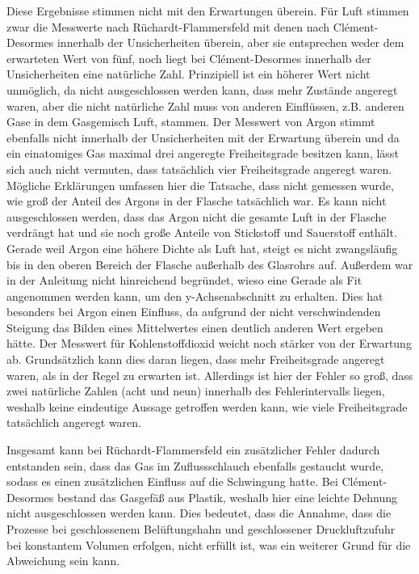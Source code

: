 \documentclass[
	a4paper,
	12pt,
	pagesize,
	ngerman
]{scrartcl}
\begin{document}
	Diese Ergebnisse stimmen nicht mit den Erwartungen überein.
	Für Luft stimmen zwar die Messwerte nach Rüchardt-Flammersfeld mit denen nach Clément-Desormes innerhalb der Unsicherheiten überein, aber sie entsprechen weder dem erwarteten Wert von fünf, noch liegt bei Clément-Desormes innerhalb der Unsicherheiten eine natürliche Zahl.
	Prinzipiell ist ein höherer Wert nicht unmöglich, da nicht ausgeschlossen werden kann, dass mehr Zustände angeregt waren, aber die nicht natürliche Zahl muss von anderen Einflüssen, z.B. anderen Gase in dem Gasgemisch Luft, stammen.
	Der Messwert von Argon stimmt ebenfalls nicht innerhalb der Unsicherheiten mit der Erwartung überein und da ein einatomiges Gas maximal drei angeregte Freiheitsgrade besitzen kann, lässt sich auch nicht vermuten, dass tatsächlich vier Freiheitsgrade angeregt waren.
	Mögliche Erklärungen umfassen hier die Tatsache, dass nicht gemessen wurde, wie groß der Anteil des Argons in der Flasche tatsächlich war.
	Es kann nicht ausgeschlossen werden, dass das Argon nicht die gesamte Luft in der Flasche verdrängt hat und sie noch große Anteile von Stickstoff und Sauerstoff enthält.
	Gerade weil Argon eine höhere Dichte als Luft hat, steigt es nicht zwangsläufig bis in den oberen Bereich der Flasche außerhalb des Glasrohrs auf.
	Außerdem war in der Anleitung nicht hinreichend begründet, wieso eine Gerade als Fit angenommen werden kann, um den y-Achsenabschnitt zu erhalten.
	Dies hat besonders bei Argon einen Einfluss, da aufgrund der nicht verschwindenden Steigung das Bilden eines Mittelwertes einen deutlich anderen Wert ergeben hätte.
	Der Messwert für Kohlenstoffdioxid weicht noch stärker von der Erwartung ab.
	Grundsätzlich kann dies daran liegen, dass mehr Freiheitsgrade angeregt waren, als in der Regel zu erwarten ist.
	Allerdings ist hier der Fehler so groß, dass zwei natürliche Zahlen (acht und neun) innerhalb des Fehlerintervalls liegen, weshalb keine eindeutige Aussage getroffen werden kann, wie viele Freiheitsgrade tatsächlich angeregt waren.
	
	Insgesamt kann bei Rüchardt-Flammersfeld ein zusätzlicher Fehler dadurch entstanden sein, dass das Gas im Zuflussschlauch ebenfalls gestaucht wurde, sodass es einen zusätzlichen Einfluss auf die Schwingung hatte.
	Bei Clément-Desormes bestand das Gasgefäß aus Plastik, weshalb hier eine leichte Dehnung nicht ausgeschlossen werden kann.
	Dies bedeutet, dass die Annahme, dass die Prozesse bei geschlossenem Belüftungshahn und geschlossener Druckluftzufuhr bei konstantem Volumen erfolgen, nicht erfüllt ist, was ein weiterer Grund für die Abweichung sein kann.
	
\end{document}
